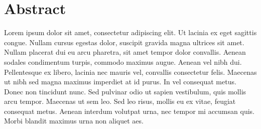 \documentclass[a4paper, 12pt]{report}
\begin{document}
\chapter*{Abstract}
Lorem ipsum dolor sit amet, consectetur adipiscing elit. Ut lacinia ex eget sagittis congue.
Nullam cursus egestas dolor, suscipit gravida magna ultrices sit amet. Nullam placerat dui eu
arcu pharetra, sit amet tempor dolor convallis. Aenean sodales condimentum turpis, commodo maximus
augue. Aenean vel nibh dui. Pellentesque ex libero, lacinia nec mauris vel, convallis consectetur
felis. Maecenas ut nibh sed magna maximus imperdiet at id purus. In vel consequat metus. Donec non
tincidunt nunc. Sed pulvinar odio ut sapien vestibulum, quis mollis arcu tempor. Maecenas ut sem leo.
Sed leo risus, mollis eu ex vitae, feugiat consequat metus. Aenean interdum volutpat urna, nec
tempor mi accumsan quis. Morbi blandit maximus urna non aliquet aes.


\tableofcontents

\clearpage

\printnoidxglossaries
















\end{document}
